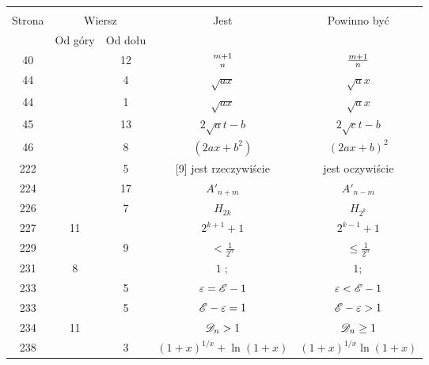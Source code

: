 \documentclass[a4paper,11pt]{article}
\begin{document}
\begin{center}
  \begin{tabular}{|c|c|c|c|c|}
    \hline
    & \multicolumn{2}{c|}{} & & \\
    Strona & \multicolumn{2}{c|}{Wiersz} & Jest
                              & Powinno być \\ \cline{2-3}
    & Od góry & Od dołu & & \\
    \hline
    40  & & 12 & ${ m + 1 \atop n }$ & $\frac{ m + 1 }{ n }$ \\
    44  & &  4 & $\sqrt{ a x }$ & $\sqrt{ a } x$ \\
    44  & &  1 & $\sqrt{ a x }$ & $\sqrt{ a } x$ \\
    45  & & 13 & $2 \sqrt{ a } t - b$ & $2 \sqrt{ c } t - b$ \\
    46  & &  8 & $( 2 a x + b^{ 2 } )$ & $( 2 a x + b )^{ 2 }$ \\
    222 & &  5 & [9] jest rzeczywiście & jest oczywiście \\
    224 & & 17 & $A'_{ n + m }$ & $A'_{ n - m }$ \\
    226 & &  7 & $H_{ 2k }$ & $H_{ 2^{ k } }$ \\
    227 & 11 & & $2^{ k + 1 } + 1$ & $2^{ k - 1 } + 1$ \\
    229 & &  9 & $< \frac{ 1 }{ 2^{ n } }$ & $\leq \frac{ 1 }{ 2^{ n } }$ \\
    231 &  8 & & $1\; ;$ & $1;$ \\
    233 & &  5 & $\varepsilon = \mathcal{E} - 1$ & $\varepsilon < \mathcal{E} - 1$ \\
    233 & &  5 & $\mathcal{E} - \varepsilon = 1$ & $\mathcal{E} - \varepsilon > 1$ \\
    234 & 11 & & $\mathcal{D}_{ n } > 1$ & $\mathcal{D}_{ n } \geq 1$ \\
    238 & &  3 & $( 1 + x )^{ 1 / x } + \ln( 1 + x )$
           & $( 1 + x )^{ 1 / x } \ln( 1 + x )$ \\
    \hline
  \end{tabular}
\end{center}
\end{document}
